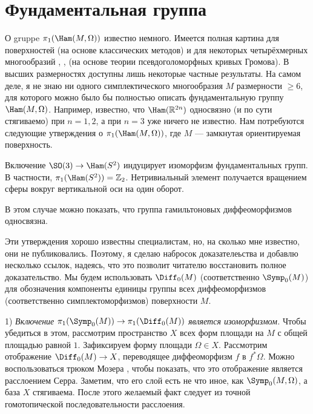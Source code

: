 \section{Фундаментальная группа}
О gruppe $\pi_1 (\Ham (M, \Omega))$ известно немного.
Имеется полная картина для поверхностей (на основе классических
методов) и для некоторых четырёхмерных многообразий \cite{G1},
\cite{A}, \cite{AM} (на основе теории псевдоголоморфных кривых
Громова). 
В высших размерностях доступны лишь некоторые частные результаты.
На самом деле, я не знаю ни одного симплектического многообразия $M$
размерности $\ge 6$, для которого можно было бы полностью описать
фундаментальную группу $\Ham (M, \Omega)$. 
Например, известно, что $\Ham (\RR^{2n})$ односвязно (и по сути
стягиваемо) при $n = 1, 2$, а при $n = 3$ уже ничего не известно. 
Нам потребуются следующие утверждения о $\pi_1 (\Ham (M, \Omega))$,
где $M$ --- замкнутая ориентируемая поверхность. 

\begin{ex}{}\label{7.2.A}
Включение $\SO(3) \z\to \Ham(S^2)$ индуцирует изоморфизм фундаментальных групп.
В частности, $\pi_1 (\Ham (S^2))\z=\ZZ_2$.
Нетривиальный элемент получается вращением сферы вокруг вертикальной
оси на один оборот. 
\end{ex}

\begin{ex}{}
\label{7.2.B}
В этом случае можно показать, что группа гамильтоновых диффеоморфизмов
односвязна. 
\end{ex}


Эти утверждения хорошо известны специалистам, но, на сколько мне известно,
они не публиковались.
Поэтому, я сделаю набросок доказателеьства и добавлю несколько ссылок,
надеясь, что это позволит читателю восстановить полное доказательство.
Мы будем использовать $\Diff_0 (M)$ (соответственно $\Symp_0 (M)$) для
обозначения компоненты единицы группы всех диффеоморфизмов
(соответственно симплектоморфизмов) поверхности $M$. 


1) \textit{Включение $\pi_1 (\Symp_0 (M)) \to \pi_1 (\Diff_0 (M))$ является
изоморфизмом.}
Чтобы убедиться в этом, рассмотрим пространство $X$ всех форм площади
на $M$ с общей площадью равной $1$. 
Зафиксируем форму площади $\Omega \in X$.
Рассмотрим отображение $\Diff_0 (M) \to X$, переводящее диффеоморфизм
$f$ в $f^\ast \Omega$. 
Можно воспользоваться трюком Мозера \cite[p. 94--95]{MS}, чтобы
показать, что это отображение является расслоением Серра. 
Заметим, что его слой есть не что иное, как $\Symp_0 (M, \Omega)$, а
база $X$ стягиваема. 
После этого желаемый факт следует из точной гомотопической
последовательности расслоения. 


